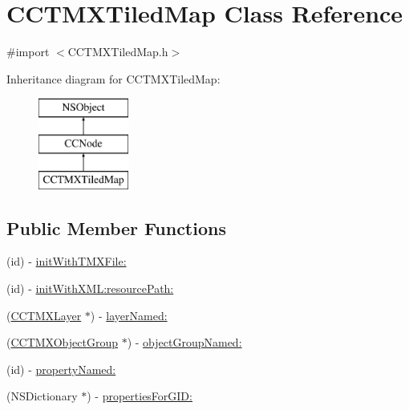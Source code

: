\hypertarget{interface_c_c_t_m_x_tiled_map}{\section{C\-C\-T\-M\-X\-Tiled\-Map Class Reference}
\label{interface_c_c_t_m_x_tiled_map}
}


{\ttfamily \#import $<$C\-C\-T\-M\-X\-Tiled\-Map.\-h$>$}

Inheritance diagram for C\-C\-T\-M\-X\-Tiled\-Map\-:\begin{figure}[H]
\begin{center}
\leavevmode
\includegraphics[height=3.000000cm]{interface_c_c_t_m_x_tiled_map}
\end{center}
\end{figure}
\subsection*{Public Member Functions}
\begin{DoxyCompactItemize}
\item 
(id) -\/ \hyperlink{interface_c_c_t_m_x_tiled_map_aef5d83a5ee72397eca77c54ed32e691e}{init\-With\-T\-M\-X\-File\-:}
\item 
(id) -\/ \hyperlink{interface_c_c_t_m_x_tiled_map_a29936f1f6f2e6b79fad270758726789a}{init\-With\-X\-M\-L\-:resource\-Path\-:}
\item 
(\hyperlink{interface_c_c_t_m_x_layer}{C\-C\-T\-M\-X\-Layer} $\ast$) -\/ \hyperlink{interface_c_c_t_m_x_tiled_map_adac42afad2f47b8d4a51d8b44fd49d30}{layer\-Named\-:}
\item 
(\hyperlink{interface_c_c_t_m_x_object_group}{C\-C\-T\-M\-X\-Object\-Group} $\ast$) -\/ \hyperlink{interface_c_c_t_m_x_tiled_map_a99f907bbcc84cbb30c8315b4b369b0fe}{object\-Group\-Named\-:}
\item 
(id) -\/ \hyperlink{interface_c_c_t_m_x_tiled_map_a9e1409d0946ca13368bcf39eda8a3009}{property\-Named\-:}
\item 
(N\-S\-Dictionary $\ast$) -\/ \hyperlink{interface_c_c_t_m_x_tiled_map_ade3b21a39e3747de3a7901fd0bb09e42}{properties\-For\-G\-I\-D\-:}
\end{DoxyCompactItemize}
